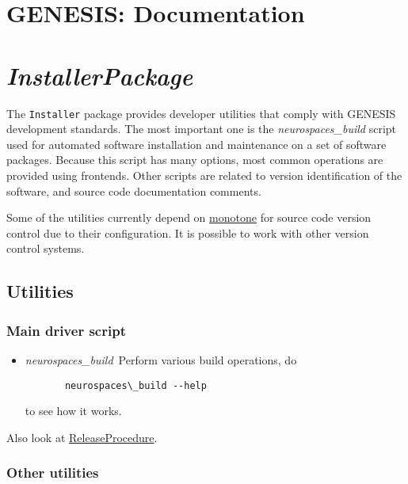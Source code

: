 \documentclass[12pt]{article}
\begin{document}
\section*{GENESIS: Documentation}

\section*{\it InstallerPackage}

The {\tt Installer} package provides developer utilities that comply with GENESIS development standards. The most important one is the {\it neurospaces\_build} script used for automated software installation and maintenance on a set of software packages. Because this script has many options, most common operations are provided using frontends. Other scripts are related to version identification of the software, and source code documentation comments.

Some of the utilities currently depend on \href{http://monotone.ca}{monotone} for source code version control due to their configuration. It is possible to work with other version control systems.

\subsection*{Utilities}

\subsubsection*{Main driver script}

\begin{itemize}
	\item {\it neurospaces\_build}\,\,\,Perform various build operations, do 
	\begin{verbatim}
	   neurospaces\_build --help
	\end{verbatim}
	   to see how it works. 
\end{itemize} 

Also look at \href{../release-procedure/release-procedure.tex}{ReleaseProcedure}.

\subsubsection*{Other utilities}
\end{document}
